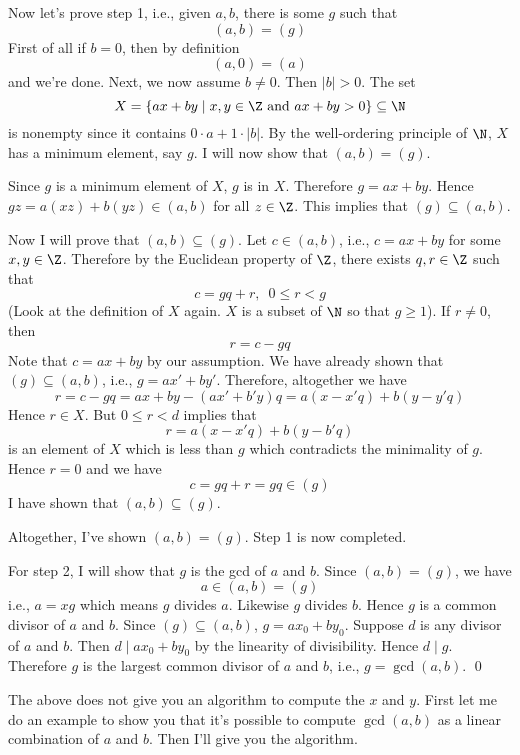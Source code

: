 Now let's prove step 1, i.e., given $a,b$, 
there is some $g$ such that
\[
(a, b) = (g)
\]
First of all if $b = 0$, then by definition
\[
(a, 0) = (a)
\]
and we're done.
Next, we now assume $b \neq 0$.
Then $|b| > 0$.
The set
\[
X = \{ax + by \mid x,y \in \Z \text{ and } ax + by > 0 \} \subseteq \N
\]
is nonempty since it contains
$0\cdot a + 1\cdot |b|$.
By the well-ordering principle of $\N$, $X$ has a minimum element, say $g$.
I will now show that $(a, b) = (g)$.

Since $g$ is a minimum element of $X$, $g$ is in $X$.
Therefore $g = ax + by$.
Hence $gz = a(xz) + b(yz) \in (a, b)$ for all $z \in \Z$.
This implies that $(g) \subseteq (a, b)$.

Now I will prove that $(a, b) \subseteq (g)$.
Let $c \in (a, b)$, i.e., $c = ax + by$ for some $x,y \in \Z$.
Therefore by the Euclidean property of $\Z$, there exists $q,r \in \Z$ such that
\[
c = gq + r, \,\,\, 0 \leq r < g
\]
(Look at the definition of $X$ again. $X$ is a subset of $\N$ so that
$g \geq 1$).
If $r \neq 0$, then
\[
r = c - gq
\]
Note that $c = ax + by$ by our assumption.
We have already shown that $(g) \subseteq (a, b)$, i.e., $g = ax' + by'$.
Therefore, altogether we have
\[
r = c - gq = ax + by - (ax' + b'y)q = a(x-x'q) + b(y-y'q)
\]
Hence $r \in X$.
But $0 \leq r < d$ implies that
\[
r = a(x-x'q) + b(y-b'q)
\]
is an element of $X$ which is less than $g$ which contradicts the
minimality of $g$.
Hence $r = 0$ and we have
\[
c = gq + r = gq \in (g)
\]
I have shown that $(a,b) \subseteq (g)$.

Altogether, I've shown $(a,b) = (g)$.
Step 1 is now completed.

For step 2, I 
will show that $g$ is the gcd of $a$ and $b$.
Since $(a,b) = (g)$, we have
\[
a \in (a,b) = (g)
\]
i.e., $a = xg$ which means $g$ divides $a$.
Likewise $g$ divides $b$.
Hence $g$ is a common divisor of $a$ and $b$.
Since $(g) \subseteq (a, b)$,
$g = ax_0 + by_0$.
Suppose $d$ is any divisor of $a$ and $b$.
Then $d \mid ax_0 + by_0$ by the linearity of divisibility.
Hence $d \mid g$.
Therefore $g$ is the largest common divisor of $a$ and $b$,
i.e., $g = \gcd(a,b)$.
\qed

The above does not give you an algorithm to compute the
$x$ and $y$.
First let me do an example to show you that
it's possible to compute $\gcd(a,b)$ as a linear combination of $a$ and $b$.
Then I'll give you the algorithm.

